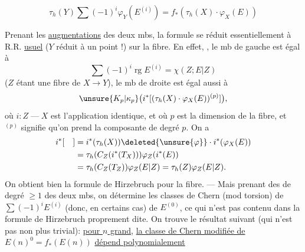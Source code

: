 
\[
\boxed{\tau_h(Y)\sum(-1)^i\varphi_Y(E^{(i)})=f_*(\tau_h(X)\cdot\varphi_X(E))}\tag{1ter}
\]

Prenant les \uline{augmentations} des deux mbs, la formule se réduit essentiellement à R.R. \uline{usuel} (\(Y\) réduit à un point !) sur la fibre. En effet, , le mb de gauche est égal à
\[
\sum(-1)^i\operatorname{rg} E^{(i)}=\chi(Z;E|Z)
\]
(\(Z\) étant une fibre de \(X\to Y\)), le mb de droite est égal aussi à
\[
\unsure{K_p|\kappa_p}\bigl(i^*[(\tau_h(X)\cdot\varphi_X(E))^{(p)}]\bigr),
\]
où \(i:Z\mathbin{\text{---}}X\) est l'application identique, et où \(p\) est la dimension de la fibre, et \({}^{(p)}\) signifie qu'on prend la composante de degré \(p\). On a
\[
\begin{aligned}
i^*[\quad]&=i^*(\tau_h(X))\deleted{\unsure{\varphi}}\cdot i^*(\varphi_X(E))\\
&=\tau_h(C_Z(i^*(T_X)))\varphi_Z(i^*(E))\\
&=\tau_h(C_Z(T_Z))\varphi_Z(E|Z)=\tau_h(Z)\varphi_Z(E|Z).
\end{aligned}
\]
On obtient bien  la formule de Hirzebruch pour la fibre. --- Mais prenant des  de degré \(\geq1\) des deux mbs, on détermine les classes de Chern (mod torsion) de \(\sum(-1)^iE^{(i)}\) (donc, en certains cas) de \(E^{(0)}\), ce qui n'est pas contenu dans la formule de Hirzebruch proprement dite. On trouve  le résultat suivant (qui n'est pas non plus trivial): \uline{pour \(n\) grand}, \uline{la classe de Chern modifiée de} \(E(n)^0=f_*(E(n))\) \uline{dépend polynomialement}

